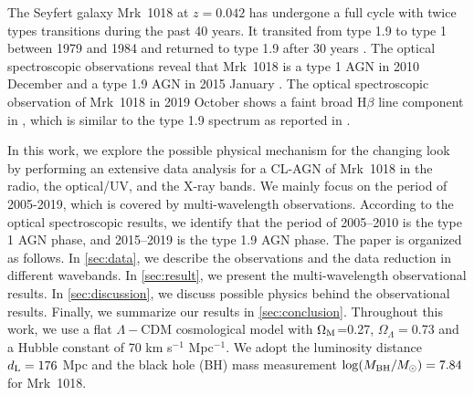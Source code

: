  
The Seyfert galaxy Mrk~1018 at $z=0.042$ has undergone a full cycle with twice types transitions during the past 40 years. It transited from type 1.9 to type 1 between 1979 and 1984 \citep{1986ApJ...311..135C} and returned to type 1.9 after 30 years \citep[see][]{2016A&A...593L...8M,2016A&A...593L...9H,2017A&A...607L...9K}. The optical spectroscopic observations reveal that Mrk~1018 is a type 1 AGN in 2010 December and a type 1.9 AGN in 2015 January \citep{2016A&A...593L...8M,2018ApJ...861...51K}. The optical spectroscopic observation of Mrk~1018 in 2019 October shows a faint broad H$\beta$ line component in \citet{2020A&A...644L...5H}, which is similar to the type 1.9 spectrum as reported in \citet[][]{2016A&A...593L...8M}. 

In this work, we explore the possible physical mechanism for the changing look by performing an extensive data analysis for a CL-AGN of Mrk~1018 in the radio, the optical/UV, and the X-ray bands. We mainly focus on the period of 2005-2019, which is covered by multi-wavelength observations. According to the optical spectroscopic results, we identify that the period of 2005--2010 is the type 1 AGN phase, and 2015--2019 is the type 1.9 AGN phase. The paper is organized as follows. In \autoref{sec:data}, we describe the observations and the data reduction in different wavebands. In \autoref{sec:result}, we present the multi-wavelength observational results. In \autoref{sec:discussion}, we discuss possible physics behind the observational results. Finally, we summarize our results in \autoref{sec:conclusion}. Throughout this work, we use a flat $\Lambda-$CDM cosmological model with $\Omega_{\rm{M}}$=0.27, $\Omega_\Lambda=$0.73 and a Hubble constant of 70 km s$^{-1}$ Mpc$^{-1}$. We adopt the luminosity distance $d_{\rm{L}}=176 $ Mpc and the black hole (BH) mass measurement $\log(M_{\rm{BH}}/M_{\odot})=7.84$ \citep{2017MNRAS.472.3492E,2018MNRAS.480.3898N} for Mrk~1018. 


